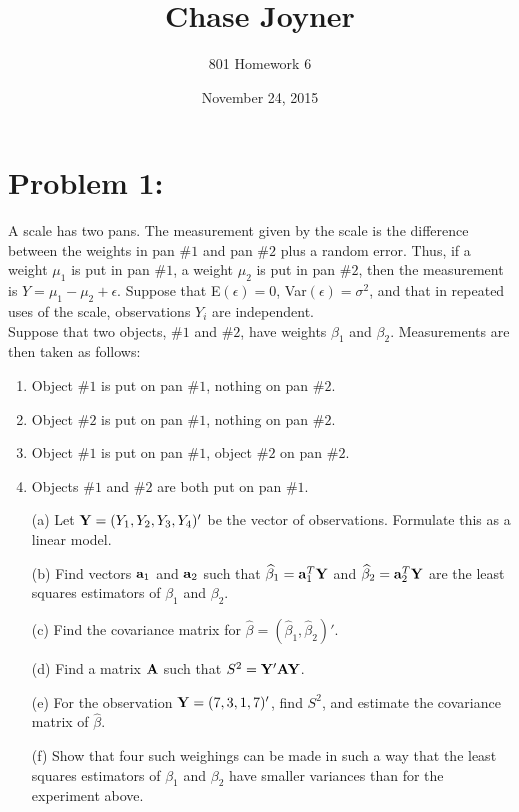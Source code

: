 \documentclass[11pt]{article}
\title{Chase Joyner}
\author{801 Homework 6}
\date{November 24, 2015}
\begin{document}
\maketitle

\section*{Problem 1:}  A scale has two pans.  The measurement given by the scale is the difference between the weights in pan $\# 1$ and pan $\# 2$ plus a random error.  Thus, if a weight $\mu_1$ is put in pan $\# 1$, a weight $\mu_2$ is put in pan $\# 2$, then the measurement is $Y = \mu_1 - \mu_2 + \epsilon$.  Suppose that E$(\epsilon) = 0$, Var$(\epsilon) = \sigma^2$, and that in repeated uses of the scale, observations $Y_i$ are independent. \\
Suppose that two objects, $\# 1$ and $\# 2$, have weights $\beta_1$ and $\beta_2$.  Measurements are then taken as follows:
\begin{enumerate}
\item Object $\# 1$ is put on pan $\# 1$, nothing on pan $\# 2$. \vspace{-7mm}\\
\item Object $\# 2$ is put on pan $\# 1$, nothing on pan $\# 2$. \vspace{-7mm}\\
\item Object $\# 1$ is put on pan $\# 1$, object $\# 2$ on pan $\# 2$. \vspace{-7mm}\\
\item Objects $\# 1$ and $\# 2$ are both put on pan $\# 1$.
\end{enumerate}
\begin{itemize}
\item[(a)]  Let ${\bf Y} = (Y_1,Y_2,Y_3,Y_4)'$ be the vector of observations.  Formulate this as a linear model.
\item[(b)]  Find vectors ${\bf a}_1$ and ${\bf a}_2$ such that $\widehat{\beta}_1 = {\bf a}_1^T{\bf Y}$ and $\widehat{\beta}_2 = {\bf a}_2^T{\bf Y}$ are the least squares estimators of $\beta_1$ and $\beta_2$. 
\item[(c)] Find the covariance matrix for $\widehat{\beta} = (\widehat{\beta}_1,\widehat{\beta}_2)'$.
\item[(d)] Find a matrix ${\bf A}$ such that $S^2 = {\bf Y}'{\bf A}{\bf Y}$.
\item[(e)]  For the observation ${\bf Y} = (7,3,1,7)'$, find $S^2$, and estimate the covariance matrix of $\widehat{\beta}$.
\item[(f)]  Show that four such weighings can be made in such a way that the least squares estimators of $\beta_1$ and $\beta_2$ have smaller variances than for the experiment above.
\end{itemize}
\end{document}
